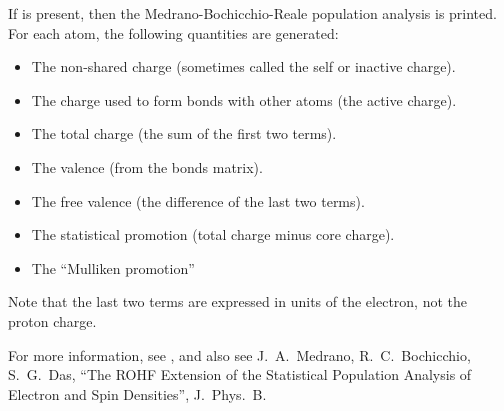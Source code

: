 If  is present, then the Medrano-Bochicchio-Reale population
analysis is printed.  For each atom, the following quantities are generated:

\begin{itemize}
\item The non-shared charge (sometimes called the self or inactive charge).
\item The charge used to form bonds with other atoms (the active charge).
\item The total charge (the sum of the first two terms).
\item The valence (from the bonds matrix).
\item The free valence (the difference of the last two terms).
\item The statistical promotion (total charge minus core charge).
\item The ``Mulliken promotion''
\end{itemize}

Note that the last two terms are expressed in units of the electron, not the
proton charge.

For more information, see \cite{nrm85,mrb86,mb89,rb91}, and also see   J.\ A.\
Medrano,  R.\ C.\ Bochicchio, S.\ G.\ Das, ``The ROHF Extension of the  Statistical
Population Analysis of Electron and Spin Densities'', J.\ Phys.\ B.\


